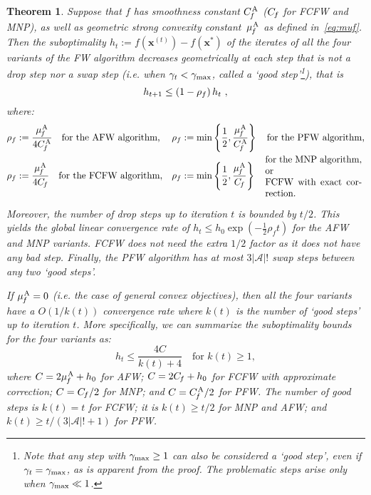 \documentclass{article} %
\newtheorem{theorem}[definition]{Theorem}
\newcommand{\stepsize}{\gamma}
\newcommand{\stepmax}{\stepsize_{\textnormal{\scriptsize max}}} %
\newcommand{\away}{{\hspace{0.06em}\textnormal{\scriptsize A}}}
\newcommand{\Cf}{C_{\hspace{-0.08em}f}}
\newcommand{\CfAFW}{C_{\hspace{-0.08em}f}^\away}
\newcommand{\strongConvAFW}{\mu_{\hspace{-0.08em}f}^\away}
\newcommand{\x}{\bm{x}}
\newcommand{\Vertices}{\mathcal{A}} %
\newcommand{\0}{\mathbf{0}} %
\begin{document}
\begin{theorem}\label{thm:megaConvergenceTheorem2}
Suppose that $f$ has smoothness constant $\CfAFW$ ($\Cf$ for FCFW and
MNP),
%
as well as geometric strong convexity constant~$\strongConvAFW$ as defined
in~\eqref{eq:muf}.
%
Then the suboptimality $h_t := f(\x^{(t)}) - f(\x^*)$ of the iterates of 
all the four variants of the FW algorithm %
%
%
%
%
%
decreases geometrically at each step that is not a drop step nor a swap step (i.e.
when $\stepsize_t < \stepmax$, called a `good step'\footnote{Note that any step with $\stepmax \geq 1$ can also
be considered a `good step', even if $\stepsize_t = \stepmax$, as is apparent from the proof. The problematic
steps arise only when $\stepmax \ll 1$.}), that is
\[
h_{t+1} \leq \left(1-\rho_f\right) h_t \ ,\vspace{-2mm}
\]
where:
\begin{align*}
	\rho_f &:= \frac{\strongConvAFW}{4\CfAFW} \quad \text{for the AFW algorithm,}  & 
		\rho_f &:= \min\left\{\frac{1}{2}, \frac{\strongConvAFW}{\CfAFW} \right\} \quad \text{for the PFW algorithm,}\\
	\rho_f &:= \frac{\strongConvAFW}{4\Cf} \quad \text{for the FCFW algorithm,} &
		\rho_f &:= \min\left\{\frac{1}{2}, \frac{\strongConvAFW}{\Cf} \right\} \quad \text{\parbox{0.3\linewidth}{for the MNP algorithm, or\\ FCFW with exact correction.}} 
\end{align*}
%
%
%
%
%
%
%
%

Moreover, the number of drop steps up to iteration $t$ is bounded by $t/2$.
%
This yields the global linear convergence rate of $h_t \leq h_0 \exp(-\frac12
\rho_f t)$ for the AFW and MNP variants. FCFW does not need the extra $1/2$
factor as it does not have any bad step. Finally, the PFW algorithm has at
most $3 |\Vertices| !$ swap steps between any two `good steps'.

If $\strongConvAFW = 0$ (i.e. the case of general convex objectives), then all the four variants have
a $O(1/k(t))$ convergence rate where $k(t)$ is the number of `good steps' up to 
iteration $t$. More specifically, we can summarize the suboptimality bounds
for the four variants as:
$$
h_t \leq \frac{4 C}{k(t) + 4}   \quad \text{for $k(t) \geq 1$},
$$
where $C = 2 \strongConvAFW + h_0$ for AFW; $C = 2 \Cf + h_0$ for 
FCFW with approximate correction; $C = \Cf/2$ for MNP; and $C=\CfAFW/2$
for PFW. The number of good steps is $k(t) = t$ for FCFW; it is $k(t) \geq t/2$ for
MNP and AFW; and $k(t) \geq t/(3|\Vertices|!+1)$ for PFW.
\end{theorem}
\end{document}
